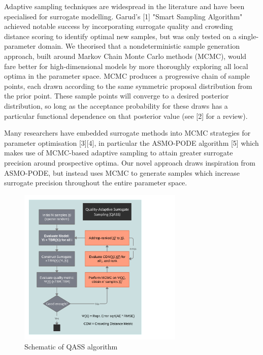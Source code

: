Adaptive sampling techniques are widespread in the literature and have been specialised for surrogate modelling. Garud's [1] "Smart Sampling Algorithm" achieved notable success by incorporating surrogate quality and crowding distance scoring to identify optimal new samples, but was only tested on a single-parameter domain. We theorised that a nondeterministic sample generation approach, built around Markov Chain Monte Carlo methods (MCMC), would fare better for high-dimensional models by more thoroughly exploring all local optima in the parameter space. MCMC produces a progressive chain of sample points, each drawn according to the same symmetric proposal distribution from the prior point. These sample points will converge to a desired posterior distribution, so long as the acceptance probability for these draws has a particular functional dependence on that posterior value (see [2] for a review). 

Many researchers have embedded surrogate methods into MCMC strategies for parameter optimisation [3][4], in particular the ASMO-PODE algorithm [5] which makes use of MCMC-based adaptive sampling to attain greater surrogate precision around prospective optima. Our novel approach draws inspiration from ASMO-PODE, but instead uses MCMC to generate samples which increase surrogate precision throughout the entire parameter space.

\begin{figure}
  \vspace{-35pt}
  \begin{center}
    \includegraphics[width=0.7\textwidth]{fig4_qassplan.png}
    \caption{Schematic of QASS algorithm}
    \label{fig:qassplan}
  \end{center}
  \vspace{-80pt}
\end{figure}

